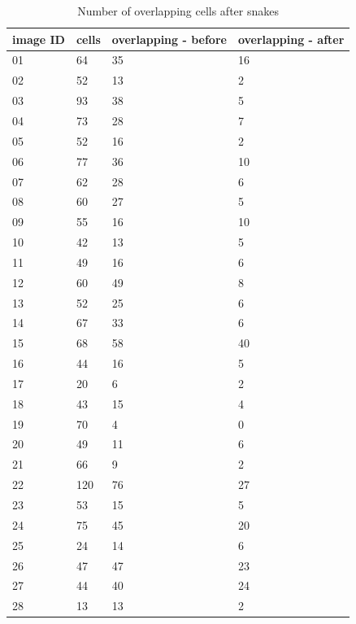 \begin{table}
	\centering
	\begin{center}

	\caption{Number of overlapping cells after snakes}
	\label{tab:Snakes}
	\begin{tabular}{|p{2cm}|p{2cm}|p{2cm}|p{2cm}|}
	\textbf{image ID} & cells &  overlapping - before &  overlapping - after \\
	\hline 
	\hline 
	01 & 64 & 35 & 16 \\
	02 & 52 & 13 & 2 \\
	03 & 93 & 38 & 5 \\
	04 & 73 & 28 & 7 \\
	05 & 52 & 16 & 2 \\
	06 & 77 & 36 & 10 \\
	07 & 62 & 28 & 6 \\
	08 & 60 & 27 & 5 \\
	09 & 55 & 16 & 10 \\
	10 & 42 & 13 & 5 \\
	11 & 49 & 16 & 6 \\
	12 & 60 & 49 & 8 \\
	13 & 52 & 25 & 6 \\
	14 & 67 & 33 & 6 \\ 
	15 & 68 & 58 & 40 \\
	16 & 44 & 16 & 5 \\
	17 & 20 & 6 & 2 \\
	18 & 43 & 15 & 4 \\
	19 & 70 & 4 & 0 \\
	20 & 49 & 11 & 6 \\
	21 & 66 & 9 & 2 \\
	22 & 120 & 76 & 27 \\
	23 & 53 & 15 & 5 \\
	24 & 75 & 45 & 20 \\
	25 & 24 & 14 & 6 \\
	26 & 47 & 47 & 23 \\
	27 & 44 & 40 & 24 \\
	28 & 13 & 13 & 2 \\
	\hline
	\end{tabular}
	\end{center}
\end{table}

